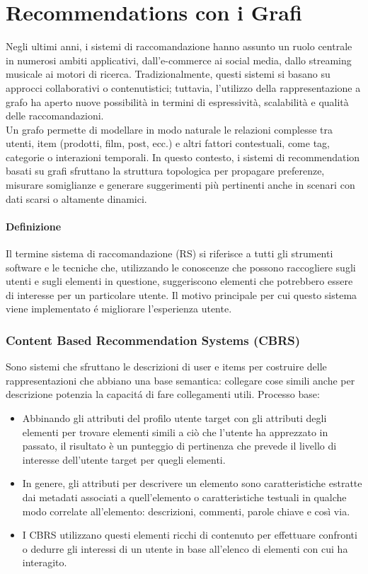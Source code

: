 \section{Recommendations con i Grafi}
Negli ultimi anni, i sistemi di raccomandazione hanno assunto un ruolo centrale in numerosi ambiti applicativi, dall’e-commerce ai social media, dallo streaming musicale ai motori di ricerca. Tradizionalmente, questi sistemi si basano su approcci collaborativi o contenutistici; tuttavia, l'utilizzo della rappresentazione a grafo ha aperto nuove possibilità in termini di espressività, scalabilità e qualità delle raccomandazioni.
\\
Un grafo permette di modellare in modo naturale le relazioni complesse tra utenti, item (prodotti, film, post, ecc.) e altri fattori contestuali, come tag, categorie o interazioni temporali. In questo contesto, i sistemi di recommendation basati su grafi sfruttano la struttura topologica per propagare preferenze, misurare somiglianze e generare suggerimenti più pertinenti anche in scenari con dati scarsi o altamente dinamici.

\paragraph{Definizione} Il termine sistema di raccomandazione (RS) si riferisce a tutti gli strumenti software e le tecniche che, utilizzando le conoscenze che possono raccogliere sugli utenti e sugli elementi in questione, suggeriscono elementi che potrebbero essere di interesse per un particolare utente. Il motivo principale per cui questo sistema viene implementato é migliorare l'esperienza utente. 

\subsubsection*{Content Based Recommendation Systems (CBRS)}
Sono sistemi che sfruttano le descrizioni di user e items per costruire delle rappresentazioni che abbiano una base semantica: collegare cose simili anche per descrizione potenzia la capacitá di fare collegamenti utili. Processo base:
\begin{itemize}
    \item Abbinando gli attributi del profilo utente target con gli attributi degli elementi per trovare elementi simili a ciò che l'utente ha apprezzato in passato, il risultato è un punteggio di pertinenza che prevede il livello di interesse dell'utente target per quegli elementi.
    \item In genere, gli attributi per descrivere un elemento sono caratteristiche estratte dai metadati associati a quell'elemento o caratteristiche testuali in qualche modo correlate all'elemento: descrizioni, commenti, parole chiave e così via.
    \item I CBRS utilizzano questi elementi ricchi di contenuto per effettuare confronti o dedurre gli interessi di un utente in base all'elenco di elementi con cui ha interagito.
\end{itemize}
